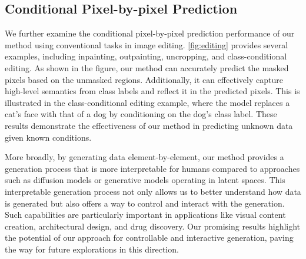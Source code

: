 \subsection{Conditional Pixel-by-pixel Prediction}

We further examine the conditional pixel-by-pixel prediction performance of our method using conventional tasks in image editing. \autoref{fig:editing} provides several examples, including inpainting, outpainting, uncropping, and class-conditional editing. As shown in the figure, our method can accurately predict the masked pixels based on the unmasked regions. Additionally, it can effectively capture high-level semantics from class labels and reflect it in the predicted pixels. This is illustrated in the class-conditional editing example, where the model replaces a cat's face with that of a dog by conditioning on the dog's class label. These results demonstrate the effectiveness of our method in predicting unknown data given known conditions.

More broadly, by generating data element-by-element, our method provides a generation process that is more interpretable for humans compared to approaches such as diffusion models or generative models operating in latent spaces. This interpretable generation process not only allows us to better understand how data is generated but also offers a way to control and interact with the generation. Such capabilities are particularly important in applications like visual content creation, architectural design, and drug discovery. Our promising results highlight the potential of our approach for controllable and interactive generation, paving the way for future explorations in this direction.

